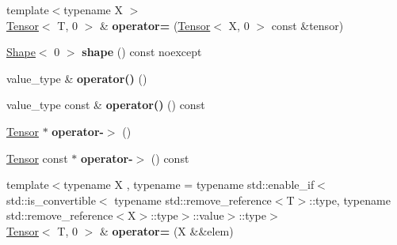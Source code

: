 \begin{DoxyCompactItemize}
\item 
{\footnotesize template$<$typename X $>$ }\\\hyperlink{classtensor_1_1Tensor}{Tensor}$<$ T, 0 $>$ \& {\bfseries operator=} (\hyperlink{classtensor_1_1Tensor}{Tensor}$<$ X, 0 $>$ const \&tensor)\hypertarget{classtensor_1_1Tensor_3_01T_00_010_01_4_ae6174c0ccdac8a472e69882385c1d933}{}\label{classtensor_1_1Tensor_3_01T_00_010_01_4_ae6174c0ccdac8a472e69882385c1d933}

\item 
\hyperlink{classtensor_1_1Shape}{Shape}$<$ 0 $>$ {\bfseries shape} () const noexcept\hypertarget{classtensor_1_1Tensor_3_01T_00_010_01_4_a731691166f0b93178deb756ebef22219}{}\label{classtensor_1_1Tensor_3_01T_00_010_01_4_a731691166f0b93178deb756ebef22219}

\item 
value\+\_\+type \& {\bfseries operator()} ()\hypertarget{classtensor_1_1Tensor_3_01T_00_010_01_4_adec1a8c7ca4045636b6cd8cb2b0364cf}{}\label{classtensor_1_1Tensor_3_01T_00_010_01_4_adec1a8c7ca4045636b6cd8cb2b0364cf}

\item 
value\+\_\+type const \& {\bfseries operator()} () const \hypertarget{classtensor_1_1Tensor_3_01T_00_010_01_4_a1aa12a54f29ff99c93457341ac0c9cff}{}\label{classtensor_1_1Tensor_3_01T_00_010_01_4_a1aa12a54f29ff99c93457341ac0c9cff}

\item 
\hyperlink{classtensor_1_1Tensor}{Tensor} $\ast$ {\bfseries operator-\/$>$} ()\hypertarget{classtensor_1_1Tensor_3_01T_00_010_01_4_a98f2c3be90503e7f646703e6ec88dda6}{}\label{classtensor_1_1Tensor_3_01T_00_010_01_4_a98f2c3be90503e7f646703e6ec88dda6}

\item 
\hyperlink{classtensor_1_1Tensor}{Tensor} const $\ast$ {\bfseries operator-\/$>$} () const \hypertarget{classtensor_1_1Tensor_3_01T_00_010_01_4_a8621d1bd1b8e8621f01347943202c78b}{}\label{classtensor_1_1Tensor_3_01T_00_010_01_4_a8621d1bd1b8e8621f01347943202c78b}

\item 
{\footnotesize template$<$typename X , typename  = typename std\+::enable\+\_\+if$<$std\+::is\+\_\+convertible$<$            typename std\+::remove\+\_\+reference$<$\+T$>$\+::type,            typename std\+::remove\+\_\+reference$<$\+X$>$\+::type$>$\+::value$>$\+::type$>$ }\\\hyperlink{classtensor_1_1Tensor}{Tensor}$<$ T, 0 $>$ \& {\bfseries operator=} (X \&\&elem)\hypertarget{classtensor_1_1Tensor_3_01T_00_010_01_4_a5f77d6e37e0da80ab78a26e9069b3f8a}{}\label{classtensor_1_1Tensor_3_01T_00_010_01_4_a5f77d6e37e0da80ab78a26e9069b3f8a}


\end{DoxyCompactItemize}

